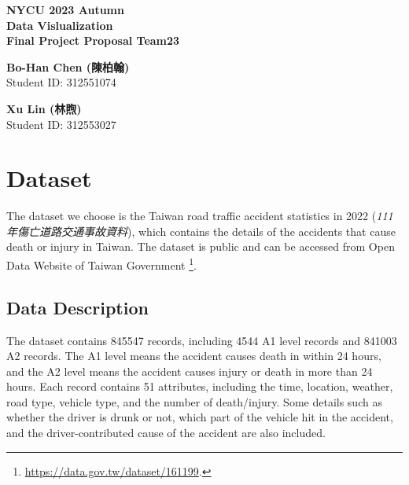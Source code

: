 \documentclass[a4paper, oneside, final, 12pt]{scrartcl} %
\begin{document}


\begin{center}
    {\fontsize{18}{30}\textbf{NYCU 2023 Autumn \\ Data Vislualization \\ Final Project Proposal Team23}} \\
\end{center}

  \begin{minipage}[t]{0.45\textwidth}
    \begin{center}
      \textbf{Bo-Han Chen (陳柏翰)} \\
      Student ID: 312551074 \\
    \end{center}
  \end{minipage}
  \begin{minipage}[t]{0.45\textwidth}
    \begin{center}
      \textbf{Xu Lin (林煦)} \\
      Student ID: 312553027 \\
    \end{center}
  \end{minipage}

\section{Dataset}

\begingroup
\raggedright

The dataset we choose is the Taiwan road traffic accident statistics 
in 2022 (\emph{111年傷亡道路交通事故資料}), which contains the details of
the accidents that cause death or injury in Taiwan.
The dataset is public and can be accessed from Open Data Website of Taiwan Government
\footnote{\url{https://data.gov.tw/dataset/161199}.}.

\subsection{Data Description}

The dataset contains 845547 records, 
including 4544 A1 level records and 841003 A2 records.
The A1 level means the accident causes death in within 24 hours,
and the A2 level means the accident causes injury or death in more than 24 hours.
Each record contains 51 attributes, including the time, location,
weather, road type, vehicle type, and the number of death/injury.
Some details such as whether the driver is drunk or not, 
which part of the vehicle hit in the accident, 
and the driver-contributed cause of the accident are also included.
\end{document}
